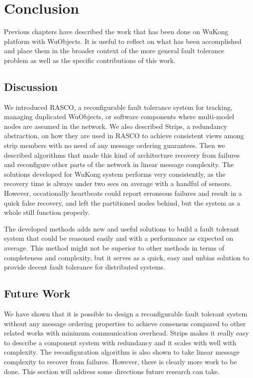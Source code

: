 \cleardoublepage
\singlespacing
\chapter{Conclusion}
\label{c:conclusion}
\doublespacing\nointerlineskip

Previous chapters have described the work that has been done on WuKong platform with WuObjects. It is useful to reflect on what has been accomplished and place them in the broader context of the more general fault tolerance problem as well as the specific contributions of this work.

\section{Discussion}

We introduced RASCO, a reconfigurable fault tolerance system for tracking, 
managing duplicated WuObjects, or software components where multi-model nodes 
are assumed in the network. We also described Strips, a redundancy 
abstraction, on how they are used in RASCO to achieve consistent views 
among strip members with no need of any message ordering guarantees. Then 
we described algorithms that made this kind of architecture recovery from 
failures and reconfigure other parts of the network in linear message 
complexity. The solutions developed for WuKong system performs very consistently, as the recovery time is always under two secs on average with a handful of sensors. However, occationally heartbeats could report erroneous failures and result in a quick false recovery, and left the partitioned nodes behind, but the system as a whole still function properly.

The developed methods adds new and useful solutions to build a fault tolerant system that could be reasoned easily and with a performance as expected on average. This method might not be superior to other methods in terms of completeness and complexity, but it serves as a quick, easy and unbias solution to provide decent fault tolerance for distributed systems.

\section{Future Work}

We have shown that it is possible to design a reconfigurable fault tolerant system without any message ordering properties to achieve consensus compared to other related works with minimum communication overhead. Strips makes it really easy to describe a component system with redundancy and it scales with well with complexity. The reconfiguration algorithm is also shown to take linear message complexity to recover from failures. However, there is clearly more work to be done. This section will address some directions future research can take.


